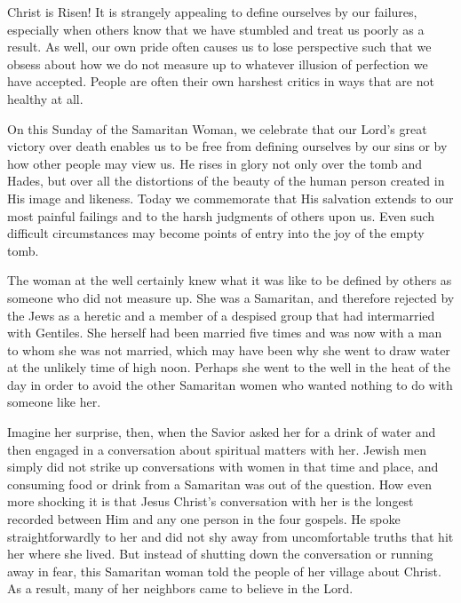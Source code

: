 \documentclass[twoside, letterpaper, 12pt]{report}
\begin{document}
\begin{maybetwocolumns}

Christ is Risen! It is strangely appealing to define ourselves by our failures, especially
when others know that we have stumbled and treat us poorly as a result. As well, our own pride
often causes us to lose perspective such that we obsess about how we do not measure up to
whatever illusion of perfection we have accepted. People are often their own harshest critics in
ways that are not healthy at all.

On this Sunday of the Samaritan Woman, we celebrate that our Lord’s great victory over death
enables us to be free from defining ourselves by our sins or by how other people may view us. He
rises in glory not only over the tomb and Hades, but over all the distortions of the beauty of the
human person created in His image and likeness. Today we commemorate that His salvation
extends to our most painful failings and to the harsh judgments of others upon us. Even such
difficult circumstances may become points of entry into the joy of the empty tomb.

The woman at the well certainly knew what it was like to be defined by others as someone who
did not measure up. She was a Samaritan, and therefore rejected by the Jews as a heretic and a
member of a despised group that had intermarried with Gentiles. She herself had been married
five times and was now with a man to whom she was not married, which may have been why she
went to draw water at the unlikely time of high noon. Perhaps she went to the well in the heat of
the day in order to avoid the other Samaritan women who wanted nothing to do with someone like
her.

Imagine her surprise, then, when the Savior asked her for a drink of water and then engaged in a
conversation about spiritual matters with her. Jewish men simply did not strike up conversations
with women in that time and place, and consuming food or drink from a Samaritan was out of the
question. How even more shocking it is that Jesus Christ’s conversation with her is the longest
recorded between Him and any one person in the four gospels. He spoke straightforwardly to her
and did not shy away from uncomfortable truths that hit her where she lived. But instead of
shutting down the conversation or running away in fear, this Samaritan woman told the people of
her village about Christ. As a result, many of her neighbors came to believe in the Lord.


\end{maybetwocolumns}
\end{document}
